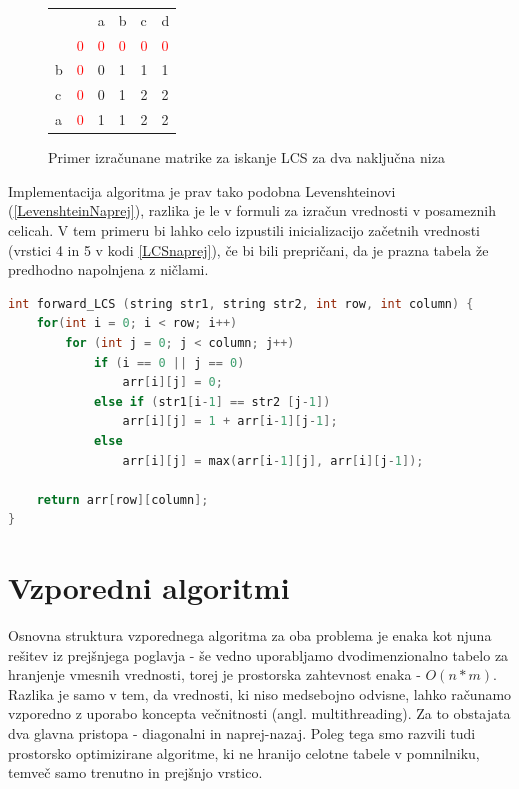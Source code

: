 \documentclass[a4paper,12pt,openright]{book}
\begin{document}
\begin{figure}[htb]
\begin{center}
\begin{tabular}{|l|l|l|l|l|l|}
\cline{3-6}
  \multicolumn{2}{c|}{}  & a & b & c & d\\ \cline{2-6}
 \multicolumn{1}{c|}{} & \textcolor{red}{0} & \textcolor{red}{0} & \textcolor{red}{0} & \textcolor{red}{0} & \textcolor{red}{0}\\ \hline
b  & \textcolor{red}{0} & 0 & \cellcolor{blue!15}1 & 1 & 1\\ \hline
c  & \textcolor{red}{0} & 0 & 1 & \cellcolor{blue!15}2 & \cellcolor{blue!15}2\\ \hline
a  & \textcolor{red}{0} & 1 & 1 & 2 & \cellcolor{blue!25}2 \\ \hline
\end{tabular}
\end{center}
\caption{Primer izračunane matrike za iskanje LCS za dva naključna niza}
\label{LCSexample}
\end{figure}



Implementacija algoritma je prav tako podobna Levenshteinovi (\ref{LevenshteinNaprej}), razlika je le v formuli za izračun vrednosti v posameznih celicah. V tem primeru bi lahko celo izpustili inicializacijo začetnih vrednosti (vrstici 4 in 5 v kodi \ref{LCSnaprej}), če bi bili prepričani, da je prazna tabela že predhodno napolnjena z ničlami. 

\bigskip \bigskip


\begin{lstlisting}[language=C++, caption={Algoritem za izračun LCS}, captionpos=b, label=LCSnaprej]
int forward_LCS (string str1, string str2, int row, int column) {
    for(int i = 0; i < row; i++) 
        for (int j = 0; j < column; j++) 
            if (i == 0 || j == 0)
                arr[i][j] = 0;
            else if (str1[i-1] == str2 [j-1])
                arr[i][j] = 1 + arr[i-1][j-1];
            else
                arr[i][j] = max(arr[i-1][j], arr[i][j-1]);

    return arr[row][column];
}
\end{lstlisting}



\chapter{Vzporedni algoritmi}

Osnovna struktura vzporednega algoritma za oba problema je enaka kot njuna rešitev iz prejšnjega poglavja - še vedno uporabljamo dvodimenzionalno tabelo za hranjenje vmesnih vrednosti, torej je prostorska zahtevnost enaka - \begin{math}O(n*m)\end{math}. Razlika je samo v tem, da vrednosti, ki niso medsebojno odvisne, lahko računamo vzporedno z uporabo koncepta večnitnosti (angl. multithreading). Za to obstajata dva glavna pristopa - diagonalni in naprej-nazaj. Poleg tega smo razvili tudi prostorsko optimizirane algoritme, ki ne hranijo celotne tabele v pomnilniku, temveč samo trenutno in prejšnjo vrstico. 
\end{document}

